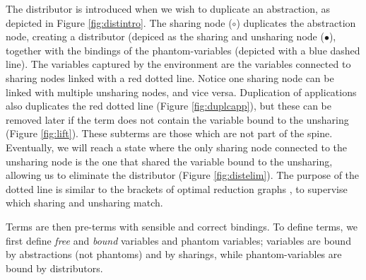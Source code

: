 \documentclass[runningheads]{llncs}
\begin{document}
The distributor is introduced when we wish to duplicate an abstraction, as depicted in Figure \ref{fig:distintro}. The sharing node ($\circ$) duplicates the abstraction node, creating a distributor (depiced as the sharing and unsharing node ($\bullet$), together with the bindings of the phantom-variables (depicted with a blue dashed line). The variables captured by the environment are the variables connected to sharing nodes linked with a red dotted line. Notice one sharing node can be linked with multiple unsharing nodes, and vice versa. Duplication of applications also duplicates the red dotted line (Figure \ref{fig:duplcapp}), but these can be removed later if the term does not contain the variable bound to the unsharing (Figure \ref{fig:lift}). These subterms are those which are not part of the spine. Eventually, we will reach a state where the only sharing node connected to the unsharing node is the one that shared the variable bound to the unsharing, allowing us to eliminate the distributor (Figure \ref{fig:distelim}). The purpose of the dotted line is similar to the brackets of optimal reduction graphs \cite{Lamping-1990,van2004lambdascope}, to supervise which sharing and unsharing match.

 Terms are then pre-terms with sensible and correct bindings. To define terms, we first define \emph{free} and \emph{bound} variables and phantom variables; variables are bound by abstractions (not phantoms) and by sharings, while phantom-variables are bound by distributors. 
\end{document}
